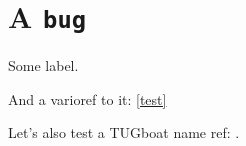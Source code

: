 \documentclass{ltugboat}
\begin{document}
\section{A \texttt{bug}}

Some label.\label{test}

And a varioref to it: \vref{test}

Let's also test a TUGboat name ref: .
\end{document}
